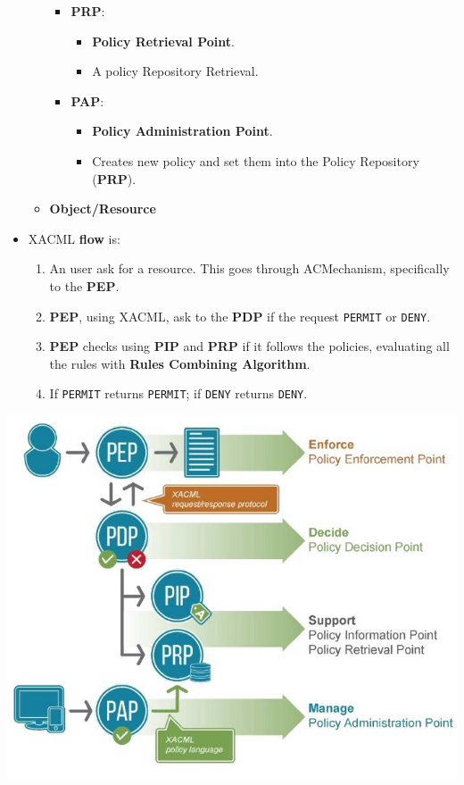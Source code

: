 \documentclass[9pt, letterpaper]{article}
\begin{document}
\begin{itemize}
\begin{itemize}
\begin{itemize}
			            \item \textbf{PRP}:
			                  \begin{itemize}
				                  \item \textbf{Policy Retrieval Point}.
				                  \item A policy Repository Retrieval.
			                  \end{itemize}

			            \item \textbf{PAP}:
			                  \begin{itemize}
				                  \item \textbf{Policy Administration Point}.
				                  \item Creates new policy and set them into the Policy Repository (\textbf{PRP}).
			                  \end{itemize}

		            \end{itemize}
		      \item \textbf{Object/Resource}
	      \end{itemize}
	\item XACML \textbf{flow} is:
	      \begin{enumerate}
		      \item An user ask for a resource. This goes through ACMechanism, specifically to the \textbf{PEP}.
		      \item \textbf{PEP}, using XACML, ask to the \textbf{PDP} if the request {\tt PERMIT} or {\tt DENY}.
		      \item \textbf{PEP} checks using \textbf{PIP} and \textbf{PRP} if it follows the policies, evaluating all the rules with \textbf{Rules Combining Algorithm}.
		      \item If {\tt PERMIT} returns {\tt PERMIT}; if {\tt DENY} returns {\tt DENY}.
	      \end{enumerate}
\end{itemize}
\begin{center}
	\includegraphics[scale=0.6]{XACML.jpg}
\end{center}
\end{document}
